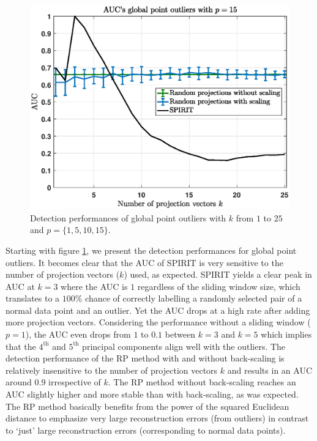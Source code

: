 \begin{figure}[h]
	\includegraphics[scale=0.35]{analysis/AUCs_point3}
	\caption{Detection performances of global point outliers with $k$ from $1$ to $25$ and $p=\{1,5,10,15\}$.}
	\label{fig:analysis_aucs_point}
	\vspace{-0.26cm}
\end{figure}

Starting with figure \ref{fig:analysis_aucs_point}, we present the detection performances for global point outliers. It becomes clear that the AUC of SPIRIT is very sensitive to the number of projection vectors ($k$) used, as expected. SPIRIT yields a clear peak in AUC at $k=3$ where the AUC is $1$ regardless of the sliding window size, which translates to a $100\%$ chance of correctly labelling a randomly selected pair of a normal data point and an outlier. Yet the AUC drops at a high rate after adding more projection vectors. Considering the performance without a sliding window ($p=1$), the AUC even drops from $1$ to $0.1$ between $k=3$ and $k=5$ which implies that the $4^{\text{th}}$ and $5^{\text{th}}$ principal components align well with the outliers. The detection performance of the RP method with and without back-scaling is relatively insensitive to the number of projection vectors $k$ and results in an AUC around $0.9$ irrespective of $k$. The RP method without back-scaling reaches an AUC slightly higher and more stable than with back-scaling, as was expected. The RP method basically benefits from the power of the squared Euclidean distance to emphasize very large reconstruction errors (from outliers) in contrast to `just' large reconstruction errors (corresponding to normal data points).

